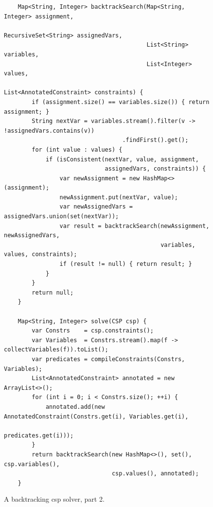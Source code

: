 \begin{figure}[!ht]
\centering
\begin{verbatim}
    Map<String, Integer> backtrackSearch(Map<String, Integer> assignment,
                                         RecursiveSet<String> assignedVars,
                                         List<String> variables,
                                         List<Integer> values,
                                         List<AnnotatedConstraint> constraints) {
        if (assignment.size() == variables.size()) { return assignment; }
        String nextVar = variables.stream().filter(v -> !assignedVars.contains(v))
                                  .findFirst().get();
        for (int value : values) {
            if (isConsistent(nextVar, value, assignment,
                             assignedVars, constraints)) {
                var newAssignment = new HashMap<>(assignment);
                newAssignment.put(nextVar, value);
                var newAssignedVars = assignedVars.union(set(nextVar));
                var result = backtrackSearch(newAssignment, newAssignedVars,
                                             variables, values, constraints);
                if (result != null) { return result; }
            }
        }
        return null;
    }

    Map<String, Integer> solve(CSP csp) {
        var Constrs    = csp.constraints();
        var Variables  = Constrs.stream().map(f -> collectVariables(f)).toList();
        var predicates = compileConstraints(Constrs, Variables);
        List<AnnotatedConstraint> annotated = new ArrayList<>();
        for (int i = 0; i < Constrs.size(); ++i) {
            annotated.add(new AnnotatedConstraint(Constrs.get(i), Variables.get(i),
                                                  predicates.get(i)));
        }
        return backtrackSearch(new HashMap<>(), set(), csp.variables(),
                               csp.values(), annotated);
    }
\end{verbatim}
\vspace*{-0.3cm}
\caption{A backtracking \Gls{csp} solver, part 2.}
\label{fig:CSP-Solver.ipynb-2}
\end{figure}

